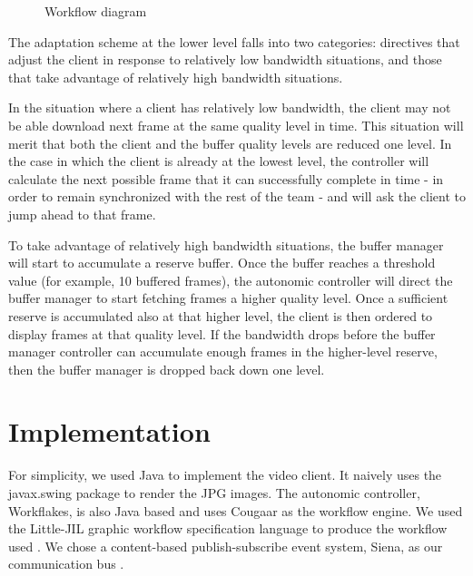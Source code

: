 \documentclass{sig-alternate}
\begin{document}
%
%

\begin{figure} 
  \centering
  \hspace*{-5mm}
  \caption{Workflow diagram }
  \label{ljil}
\end{figure}

The adaptation scheme at the lower level falls into two categories:
directives that adjust the client in response to relatively low
bandwidth situations, and those that take advantage of relatively high
bandwidth situations.

In the situation where a client has relatively low bandwidth, the
client may not be able download next frame at the same quality level
in time.  This situation will merit that both the client and the
buffer quality levels are reduced one level. In the case in which the
client is already at the lowest level, the controller will calculate
the next possible frame that it can successfully complete in time - in
order to remain synchronized with the rest of the team - and will ask
the client to jump ahead to that frame.

To take advantage of relatively high bandwidth situations, the buffer
manager will start to accumulate a reserve buffer.  Once the buffer
reaches a threshold value (for example, 10 buffered frames), the
autonomic controller will direct the buffer manager to start fetching
frames a higher quality level.  Once a sufficient reserve is
accumulated also at that higher level, the client is then ordered to
display frames at that quality level.  If the bandwidth drops before
the buffer manager controller can accumulate enough frames in the
higher-level reserve, then the buffer manager is dropped back down one
level.

\section{Implementation} \label{implementation}

For simplicity, we used Java to implement the video client.  It
naively uses the javax.swing package to render the JPG images.  The
autonomic controller, Workflakes, is also Java based and uses Cougaar
\cite{COUGAAR} as the workflow engine.  We used the Little-JIL graphic
workflow specification language to produce the workflow used
\cite{LJIL}.  We chose a content-based publish-subscribe event system,
Siena, as our communication bus \cite{SIENA}.
\end{document}
